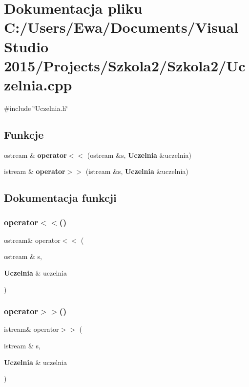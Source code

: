 \section{Dokumentacja pliku C\+:/\+Users/\+Ewa/\+Documents/\+Visual Studio 2015/\+Projects/\+Szkola2/\+Szkola2/\+Uczelnia.cpp}
\label{_uczelnia_8cpp}
{\ttfamily \#include \char`\"{}Uczelnia.\+h\char`\"{}}\newline
\subsection*{Funkcje}
\begin{DoxyCompactItemize}
\item 
ostream \& \textbf{ operator$<$$<$} (ostream \&s, \textbf{ Uczelnia} \&uczelnia)
\item 
istream \& \textbf{ operator$>$$>$} (istream \&s, \textbf{ Uczelnia} \&uczelnia)
\end{DoxyCompactItemize}


\subsection{Dokumentacja funkcji}
\mbox{\label{_uczelnia_8cpp_aaf33c9cc9b0585496b98d8d0e8558073}} 
\subsubsection{operator$<$$<$()}
{\footnotesize\ttfamily ostream\& operator$<$$<$ (\begin{DoxyParamCaption}\item[{ostream \&}]{s,  }\item[{\textbf{ Uczelnia} \&}]{uczelnia }\end{DoxyParamCaption})}

\mbox{\label{_uczelnia_8cpp_a552d164e736a7caa10caed6410bf63ea}} 
\subsubsection{operator$>$$>$()}
{\footnotesize\ttfamily istream\& operator$>$$>$ (\begin{DoxyParamCaption}\item[{istream \&}]{s,  }\item[{\textbf{ Uczelnia} \&}]{uczelnia }\end{DoxyParamCaption})}

